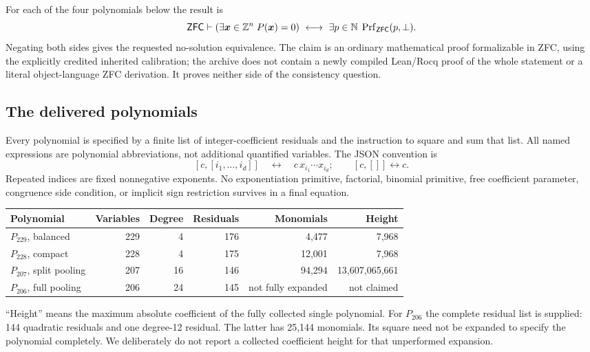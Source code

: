 \documentclass[10pt,letterpaper]{article}
\theoremstyle{definition}\newtheorem{definition}[theorem]{Definition}
\theoremstyle{remark}\newtheorem{remark}[theorem]{Remark}
\newcommand{\Z}{\mathbb Z}\newcommand{\N}{\mathbb N}\newcommand{\Q}{\mathbb Q}
\newcommand{\Prf}{\operatorname{Prf}}
\begin{document}
For each of the four polynomials below the result is
\begin{equation}\label{eq:target}
 \ZFC\vdash
 \left(\exists\boldsymbol{x}\in\Z^n\;P(\boldsymbol{x})=0\right)
 \ \longleftrightarrow\
 \exists p\in\N\;\Prf_{\ZFC}(p,\bot).
\end{equation}
Negating both sides gives the requested no-solution equivalence. The
claim is an ordinary mathematical proof formalizable in ZFC, using the
explicitly credited inherited calibration; the archive does not contain
a newly compiled Lean/Rocq proof of the whole statement or a literal
object-language ZFC derivation. It proves neither side of the consistency
question.

\subsection{The delivered polynomials}

Every polynomial is specified by a finite list of integer-coefficient
residuals and the instruction to square and sum that list. All named
expressions are polynomial abbreviations, not additional quantified
variables. The JSON convention is
\[
 [c,[i_1,\ldots,i_d]]\quad\longleftrightarrow\quad
 c\,x_{i_1}\cdots x_{i_d};\qquad[c,[]]\longleftrightarrow c.
\]
Repeated indices are fixed nonnegative exponents. No exponentiation
primitive, factorial, binomial primitive, free coefficient parameter,
congruence side condition, or implicit sign restriction survives in a
final equation.

\begin{center}\small
\begin{tabular}{@{}lrrrrr@{}}
\toprule
Polynomial & Variables & Degree & Residuals & Monomials & Height\\
\midrule
$P_{229}$, balanced &229&4&176&4,477&7,968\\
$P_{228}$, compact &228&4&175&12,001&7,968\\
$P_{207}$, split pooling &207&16&146&94,294&13,607,065,661\\
$P_{206}$, full pooling &206&24&145&not fully expanded&not claimed\\
\bottomrule
\end{tabular}
\end{center}
``Height'' means the maximum absolute coefficient of the fully collected
single polynomial. For $P_{206}$ the complete residual list is supplied:
144 quadratic residuals and one degree-12 residual. The latter has
25,144 monomials. Its square need not be expanded to specify the
polynomial completely. We deliberately do not report a collected
coefficient height for that unperformed expansion.
\end{document}
